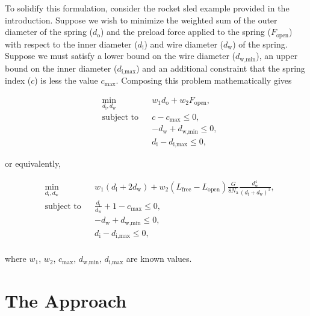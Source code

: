 \documentclass[10pt]{article}
\begin{document}
To solidify this formulation, consider the rocket sled example provided in the introduction. Suppose we wish to minimize the weighted sum of the outer diameter of the spring ($d_{\text{o}}$) and the preload force applied to the spring ($F_{\text{open}}$) with respect to the inner diameter ($d_{\text{i}}$) and wire diameter ($d_{\text{w}}$) of the spring. Suppose we must satisfy a lower bound on the wire diameter ($d_{\text{w,min}}$), an upper bound on the inner diameter ($d_{\text{i,max}}$) and an additional constraint that the spring index ($c$) is less the value $c_{\text{max}}$. Composing this problem mathematically gives

				\begin{equation*}
 					\begin{aligned}
 						& \underset{d_{\text{i}}, d_{\text{w}}}{\text{min}}
 						& & w_{1}d_{\text{o}} + w_{2}F_{\text{open}}, \\
 						& \text{subject to}
						& & c - c_{\text{max}}\le 0, \\
						&
 						& & -d_{\text{w}} + d_{\text{w,min}}\le 0, \\
					 	&
						& & d_{\text{i}} - d_{\text{i,max}} \le 0,
					\end{aligned}
				\end{equation*}

or equivalently,

\begin{equation*}
 					\begin{aligned}
 						& \underset{d_{\text{i}}, d_{\text{w}}}{\text{min}}
 						& & w_{1}(d_{\text{i}} + 2d_{\text{w}}) + w_{2}(L_{\text{free}}-L_{\text{open}})\frac{G}{8N_{\text{a}}}\frac{d_{\text{w}}^{4}}{(d_{\text{i}} + d_{\text{w}})^{3}}, \\
 						& \text{subject to}
						& & \frac{d_{\text{i}}}{d_{\text{w}}} + 1 - c_{\text{max}}\le 0, \\
						&
 						& & -d_{\text{w}} + d_{\text{w,min}} \le 0, \\
					 	&
						& & d_{\text{i}} - d_{\text{i,max}} \le 0, \\
 					\end{aligned}
				\end{equation*}		

where $w_{1}$, $w_{2}$, $c_{\text{max}}$, $d_{\text{w,min}}$, $d_{\text{i,max}}$ are known values.

\section{The Approach}
\label{sec:The_Approach}
\end{document}
